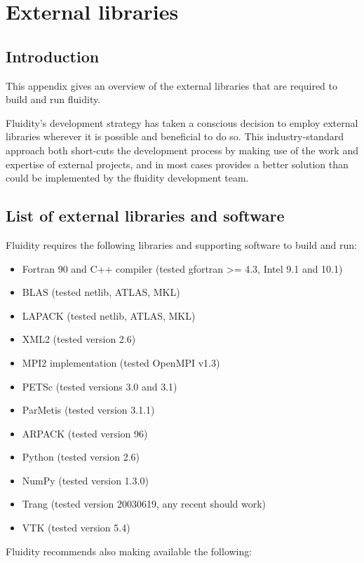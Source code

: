 \chapter{External libraries}\label{chap:external}

\section{Introduction}

This appendix gives an overview of the external libraries that are required to
build and run fluidity.

Fluidity's development strategy has taken a conscious decision to employ
external libraries wherever it is possible and beneficial to do so. This
industry-standard approach both short-cuts the development process by making
use of the work and expertise of external projects, and in most cases provides
a better solution than could be implemented by the fluidity development team.

\section{List of external libraries and software}
\label{sect:required_ḻibraries_list}

Fluidity requires the following libraries and supporting software to build and
run:

\begin{itemize}
\item Fortran 90 and C++ compiler (tested gfortran >= 4.3, Intel 9.1 and 10.1)
\item BLAS (tested netlib, ATLAS, MKL)
\item LAPACK (tested netlib, ATLAS, MKL)
\item XML2 (tested version 2.6)
\item MPI2 implementation (tested OpenMPI v1.3)
\item PETSc (tested versions 3.0 and 3.1)
\item ParMetis (tested version 3.1.1)
\item ARPACK (tested version 96)
\item Python (tested version 2.6) 
\item NumPy (tested version 1.3.0)
\item Trang (tested version 20030619, any recent should work)
\item VTK (tested version 5.4)
\end{itemize}

Fluidity recommends also making available the following:


